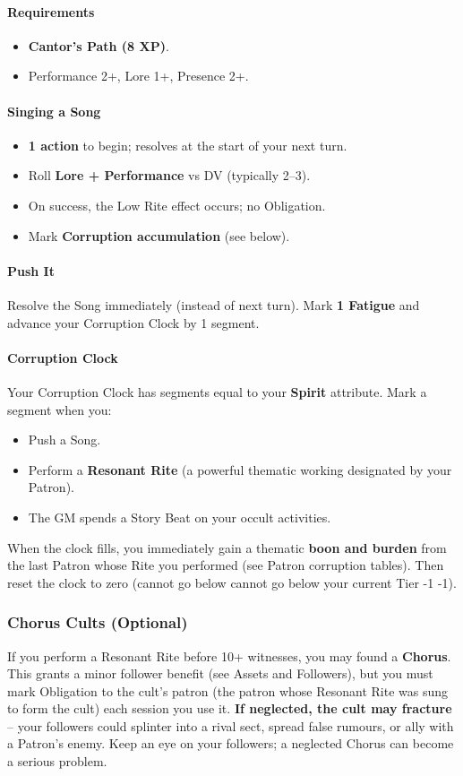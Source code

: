 \paragraph{Requirements}
\begin{itemize}
  \item \textbf{Cantor's Path (8 XP)}.
  \item Performance 2+, Lore 1+, Presence 2+.
\end{itemize}

\paragraph{Singing a Song}
\begin{itemize}
  \item \textbf{1 action} to begin; resolves at the start of your next turn.
  \item Roll \textbf{Lore + Performance} vs DV (typically 2--3).
  \item On success, the Low Rite effect occurs; no Obligation.
  \item Mark \textbf{Corruption accumulation} (see below).
\end{itemize}

\paragraph{Push It}
Resolve the Song immediately (instead of next turn). Mark \textbf{1 Fatigue} and advance your Corruption Clock by 1 segment.

\paragraph{Corruption Clock}
Your Corruption Clock has segments equal to your \textbf{Spirit} attribute. Mark a segment when you:
\begin{itemize}
  \item Push a Song.
  \item Perform a \textbf{Resonant Rite} (a powerful thematic working designated by your Patron).
  \item The GM spends a Story Beat on your occult activities.
\end{itemize}
When the clock fills, you immediately gain a thematic \textbf{boon and burden} from the last Patron whose Rite you performed (see Patron corruption tables). Then reset the clock to zero (cannot go below cannot go below your current Tier -1 -1).

\subsubsection*{Chorus Cults (Optional)}
If you perform a Resonant Rite before 10+ witnesses, you may found a \textbf{Chorus}. This grants a minor follower benefit (see Assets and Followers), but you must mark Obligation to the cult's patron (the patron whose Resonant Rite was sung to form the cult) each session you use it. \textbf{If neglected, the cult may fracture} -- your followers could splinter into a rival sect, spread false rumours, or ally with a Patron's enemy. Keep an eye on your followers; a neglected Chorus can become a serious problem.

